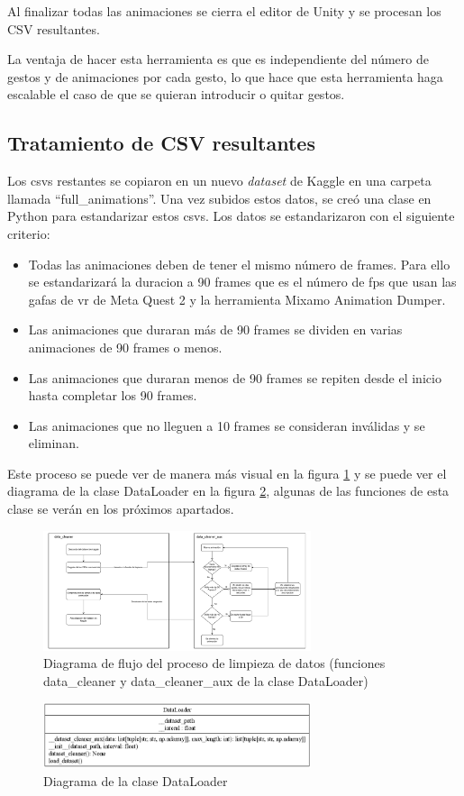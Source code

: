 Al finalizar todas las animaciones se cierra el editor de Unity y se procesan los CSV resultantes.

La ventaja de hacer esta herramienta es que es independiente del número de gestos y de animaciones por cada gesto, lo que hace que esta herramienta haga escalable el caso de que se quieran introducir o quitar gestos.

\subsection{Tratamiento de CSV resultantes}

Los \glspl{csv} restantes se copiaron en un nuevo \textit{dataset} de Kaggle en una carpeta llamada ``full\_animations''. Una vez subidos estos datos, se creó una clase en Python para estandarizar estos \glspl{csv}. Los datos se estandarizaron con el siguiente criterio:
\begin{itemize}
    \item Todas las animaciones deben de tener el mismo número de frames. Para ello se estandarizará la duracion a 90 frames que es el número de \gls{fps} que usan las gafas de \gls{vr} de Meta Quest 2 y la herramienta Mixamo Animation Dumper.
    \item Las animaciones que duraran más de 90 frames se dividen en varias animaciones de 90 frames o menos.
    \item Las animaciones que duraran menos de 90 frames se repiten desde el inicio hasta completar los 90 frames.
    \item Las animaciones que no lleguen a 10 frames se consideran inválidas y se eliminan.
\end{itemize}

Este proceso se puede ver de manera más visual en la figura \ref{fig:data_cleaner} y se puede ver el diagrama de la clase DataLoader en la figura \ref{fig:data_loader}, algunas de las funciones de esta clase se verán en los próximos apartados.

\begin{figure}[H]
    \centering
    \includegraphics[width=0.7\textwidth]{Imagenes/Vectorial/data_cleaner.pdf}
    \caption{Diagrama de flujo del proceso de limpieza de datos (funciones data\_cleaner y data\_cleaner\_aux de la clase DataLoader)}
    \label{fig:data_cleaner}
\end{figure}

\begin{figure}[H]
    \centering
    \includegraphics[width=0.7\textwidth]{Imagenes/Bitmap/DataLoader_UML.png}
    \caption{Diagrama de la clase DataLoader}
    \label{fig:data_loader}
\end{figure}

